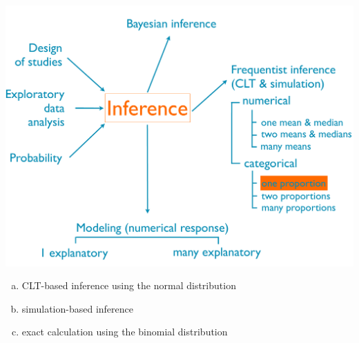 \documentclass[slidestop,compress,mathserif,12pt,t,professionalfonts,xcolor=table]{beamer}
\newcommand{\solnMult}[1]{#1}
\begin{document}
\begin{frame}

{
{\scriptsize
{}}}
{
 \includegraphics[width=\textwidth]{figures/map/one_prop}
}

\vfill

\begin{enumerate}[(a)]
\item \solnMult{CLT-based inference using the normal distribution}
\item simulation-based inference
\item \solnMult{exact calculation using the binomial distribution}
\end{enumerate}

\end{frame}

\end{document}
